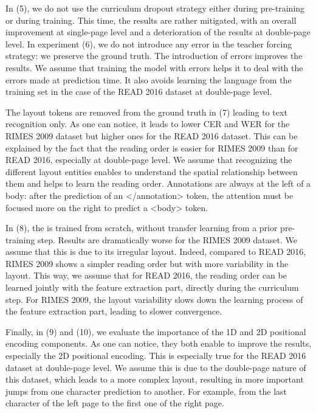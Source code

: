 In (5), we do not use the curriculum dropout strategy either during pre-training or during training. This time, the results are rather mitigated, with an overall improvement at single-page level and a deterioration of the results at double-page level.
In experiment (6), we do not introduce any error in the teacher forcing strategy: we preserve the ground truth. The introduction of errors improves the results. We assume that training the model with errors helps it to deal with the errors made at prediction time. It also avoids learning the language from the training set in the case of the READ 2016 dataset at double-page level.

The layout tokens are removed from the ground truth in (7) leading to text recognition only. As one can notice, it leads to lower CER and WER for the RIMES 2009 dataset but higher ones for the READ 2016 dataset. This can be explained by the fact that the reading order is easier for RIMES 2009 than for READ 2016, especially at double-page level. We assume that recognizing the different layout entities enables to understand the spatial relationship between them and helps to learn the reading order. Annotations are always at the left of a body: after the prediction of an </annotation> token, the attention must be focused more on the right to predict a <body> token. 

In (8), the \modelacc{} is trained from scratch, without transfer learning from a prior pre-training step. Results are dramatically worse for the RIMES 2009 dataset. We assume that this is due to its irregular layout. Indeed, compared to READ 2016, RIMES 2009 shows a simpler reading order but with more variability in the layout. This way, we assume that for READ 2016, the reading order can be learned jointly with the feature extraction part, directly during the curriculum step. For RIMES 2009, the layout variability slows down the learning process of the feature extraction part, leading to slower convergence.

Finally, in (9) and (10), we evaluate the importance of the 1D and 2D positional encoding components. As one can notice, they both enable to improve the results, especially the 2D positional encoding. This is especially true for the READ 2016 dataset at double-page level. We assume this is due to the double-page nature of this dataset, which leads to a more complex layout, resulting in more important jumps from one character prediction to another. For example, from the last character of the left page to the first one of the right page.
